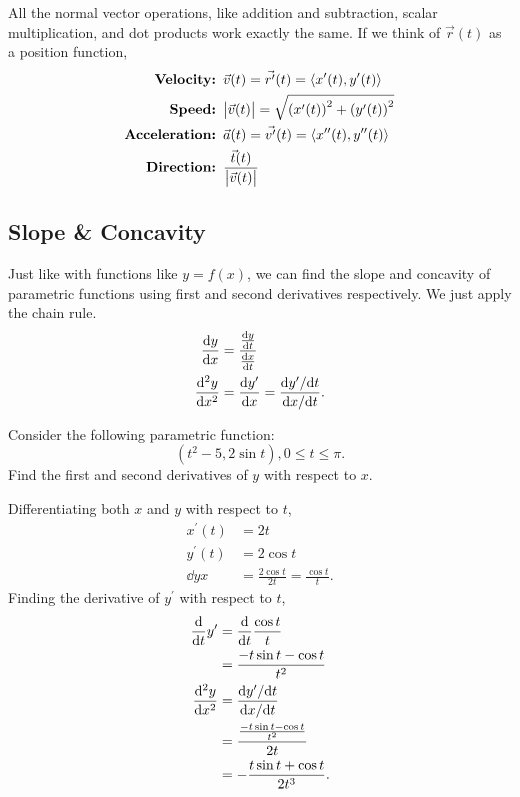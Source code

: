 All the normal vector operations, like addition and subtraction, scalar multiplication, and dot products work exactly the same.
If we think of $\vec{r}(t)$ as a position function,
\begin{align*}
	\textbf{Velocity: }& \vec{v}(t) = \vec{r^\prime}(t) = \langle x^\prime(t), y^\prime(t) \rangle \\
	\textbf{Speed: }& \big\lvert \vec{v}(t) \big\rvert = \sqrt{\left(x^\prime(t)\right)^2 + \left(y^\prime(t)\right)^2} \\
	\textbf{Acceleration: }& \vec{a}(t) = \vec{v^\prime}(t) = \langle x^{\prime\prime}(t), y^{\prime\prime}(t) \rangle \\
	\textbf{Direction: }& \frac{\vec{t}(t)}{\big\lvert \vec{v}(t) \big\rvert} \\
\end{align*}

\subsection{Slope \& Concavity}
Just like with functions like $y=f(x)$, we can find the slope and concavity of parametric functions using first and second derivatives respectively.
We just apply the chain rule.
\begin{align*}
	\frac{\mathrm{d} y}{\mathrm{d} x} &= \frac{\frac{\mathrm{d} y}{\mathrm{d} t}}{\frac{\mathrm{d} x}{\mathrm{d} t}} \\
	\frac{\mathrm{d} ^2y}{\mathrm{d} x^2} &= \frac{\mathrm{d} y^\prime}{\mathrm{d} x} = \frac{\mathrm{d} y^\prime/\mathrm{d} t}{\mathrm{d} x/\mathrm{d} t}.
\end{align*}

\begin{example}
	Consider the following parametric function:
	\begin{equation*}
		(t^2-5, 2\sin{t}), 0\leq t\leq\pi.
	\end{equation*}
	Find the first and second derivatives of $y$ with respect to $x$.
\end{example}
\begin{answer}
	Differentiating both $x$ and $y$ with respect to $t$,
	\begin{align*}
		x^\prime(t) &= 2t \\
		y^\prime(t) &= 2\cos{t} \\
		\dd{y}{x} &= \frac{2\cos{t}}{2t} = \frac{\cos{t}}{t}.
	\end{align*}
	Finding the derivative of $y^\prime$ with respect to $t$,
	\begin{align*}
		\frac{\mathrm{d} }{\mathrm{d} t}y^\prime &= \frac{\mathrm{d} }{\mathrm{d} t}\frac{\cos{t}}{t} \\
		&= \frac{-t\sin{t}-\cos{t}}{t^2} \\
		\frac{\mathrm{d} ^2y}{\mathrm{d} x^2} &= \frac{\mathrm{d} y^\prime/\mathrm{d} t}{\mathrm{d} x/\mathrm{d} t} \\
		&= \frac{\frac{-t\sin{t}-\cos{t}}{t^2}}{2t} \\
		&= -\frac{t\sin{t}+\cos{t}}{2t^3}.
	\end{align*}
\end{answer}

